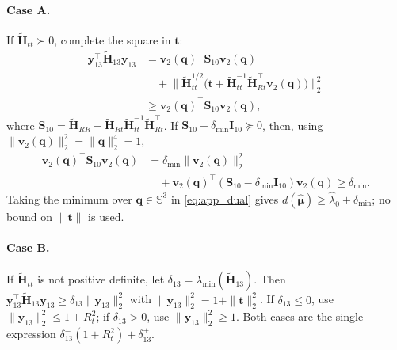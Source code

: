 \paragraph{Case A.} If $\tilde{\mathbf H}_{tt}\succ0$, complete the square in $\mathbf t$:
\begin{equation}
\begin{aligned}
\mathbf y_{13}^\top\tilde{\mathbf H}_{13}\mathbf y_{13}
&=\mathbf v_2(\mathbf q)^\top\mathbf S_{10}\mathbf v_2(\mathbf q)\\
&\quad+\big\|\tilde{\mathbf H}_{tt}^{1/2}\big(\mathbf t+\tilde{\mathbf H}_{tt}^{-1}\tilde{\mathbf H}_{Rt}^\top\mathbf v_2(\mathbf q)\big)\big\|_2^2\\
&\ge\mathbf v_2(\mathbf q)^\top\mathbf S_{10}\mathbf v_2(\mathbf q),
\end{aligned}
\end{equation}
where $\mathbf S_{10}=\tilde{\mathbf H}_{RR}-\tilde{\mathbf H}_{Rt}\tilde{\mathbf H}_{tt}^{-1}\tilde{\mathbf H}_{Rt}^\top$. If $\mathbf S_{10}-\delta_{\min}\mathbf I_{10}\succeq0$, then, using $\|\mathbf v_2(\mathbf q)\|_2^2=\|\mathbf q\|_2^4=1$,
\begin{equation}
\begin{aligned}
\mathbf v_2(\mathbf q)^\top\mathbf S_{10}\mathbf v_2(\mathbf q)
&=\delta_{\min}\|\mathbf v_2(\mathbf q)\|_2^2\\
&\quad+\mathbf v_2(\mathbf q)^\top(\mathbf S_{10}-\delta_{\min}\mathbf I_{10})\mathbf v_2(\mathbf q)\ge\delta_{\min}.
\end{aligned}
\end{equation}
Taking the minimum over $\mathbf q\in\mathbb S^3$ in \eqref{eq:app_dual} gives $d(\hat{\boldsymbol\mu})\ge\hat\lambda_0+\delta_{\min}$; no bound on $\|\mathbf t\|$ is used.

\paragraph{Case B.} If $\tilde{\mathbf H}_{tt}$ is not positive definite, let $\delta_{13}=\lambda_{\min}(\tilde{\mathbf H}_{13})$. Then $\mathbf y_{13}^\top\tilde{\mathbf H}_{13}\mathbf y_{13}\ge\delta_{13}\|\mathbf y_{13}\|_2^2$ with $\|\mathbf y_{13}\|_2^2=1+\|\mathbf t\|_2^2$. If $\delta_{13}\le0$, use $\|\mathbf y_{13}\|_2^2\le1+R_t^2$; if $\delta_{13}>0$, use $\|\mathbf y_{13}\|_2^2\ge1$. Both cases are the single expression $\delta_{13}^-(1+R_t^2)+\delta_{13}^+$.

